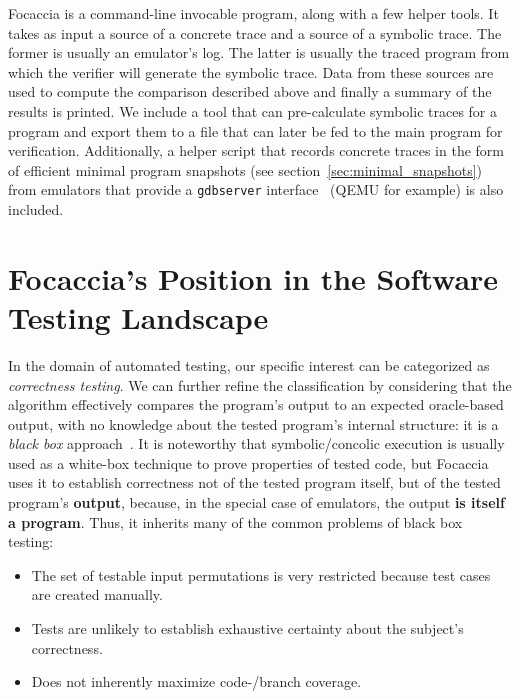 Focaccia is a command-line invocable program, along with a few helper tools. It takes as input a source of a concrete
trace and a source of a symbolic trace. The former is usually an emulator's log. The latter is usually the traced
program from which the verifier will generate the symbolic trace. Data from these sources are used to compute the
comparison described above and finally a summary of the results is printed. We include a tool that can pre-calculate
symbolic traces for a program and export them to a file that can later be fed to the main program for verification.
Additionally, a helper script that records concrete traces in the form of efficient minimal program snapshots (see
section~\ref{sec:minimal_snapshots}) from emulators that provide a \texttt{gdbserver}
interface~\cite{Sourceware2024GdbRemoteProtocol} (QEMU for example) is also included.

\section{Focaccia's Position in the Software Testing Landscape}

In the domain of automated testing, our specific interest can be categorized as \textit{correctness testing}. We can
further refine the classification by considering that the algorithm effectively compares the program's output to an
expected oracle-based output, with no knowledge about the tested program's internal structure: it is a \textit{black
box} approach~\cite{sawant2012software}. It is noteworthy that symbolic/concolic execution is usually used as a
white-box technique to prove properties of tested code, but Focaccia uses it to establish correctness not of the tested
program itself, but of the tested program's \textbf{output}, because, in the special case of emulators, the output
\textbf{is itself a program}. Thus, it inherits many of the common problems of black box testing:

\begin{itemize}
    \item The set of testable input permutations is very restricted because test cases are created manually.
    \item Tests are unlikely to establish exhaustive certainty about the subject's correctness.
    \item Does not inherently maximize code-/branch coverage.
\end{itemize}

